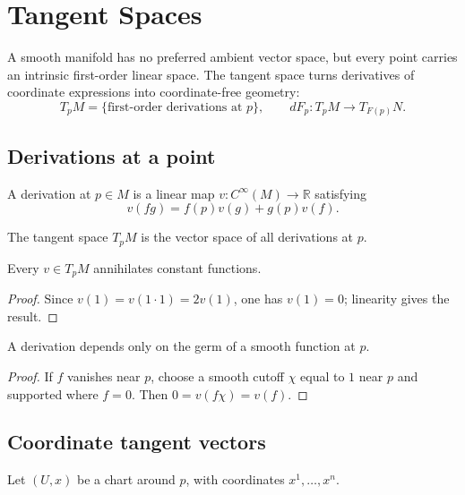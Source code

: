 \chapter{Tangent Spaces}
\label{ch:vii04-tangent-spaces}

A smooth manifold has no preferred ambient vector space, but every point carries an intrinsic first-order linear space. The tangent space turns derivatives of coordinate expressions into coordinate-free geometry:
\[
\boxed{T_pM=\{\text{first-order derivations at }p\},\qquad dF_p:T_pM\to T_{F(p)}N.}
\]

\section{Derivations at a point}
\begin{definition}\label{def:vii04-derivation}
A derivation at \(p\in M\) is a linear map \(v:C^\infty(M)\to\mathbb R\) satisfying
\[
v(fg)=f(p)v(g)+g(p)v(f).
\]
\end{definition}

\begin{definition}\label{def:vii04-tangent-space}
The tangent space \(T_pM\) is the vector space of all derivations at \(p\).
\end{definition}

\begin{proposition}\label{prop:vii04-constants}
Every \(v\in T_pM\) annihilates constant functions.
\end{proposition}
\begin{proof}
Since \(v(1)=v(1\cdot1)=2v(1)\), one has \(v(1)=0\); linearity gives the result.
\end{proof}

\begin{proposition}\label{prop:vii04-locality}
A derivation depends only on the germ of a smooth function at \(p\).
\end{proposition}
\begin{proof}
If \(f\) vanishes near \(p\), choose a smooth cutoff \(\chi\) equal to \(1\) near \(p\) and supported where \(f=0\). Then \(0=v(f\chi)=v(f)\).
\end{proof}

\section{Coordinate tangent vectors}
Let \((U,x)\) be a chart around \(p\), with coordinates \(x^1,\dots,x^n\).

